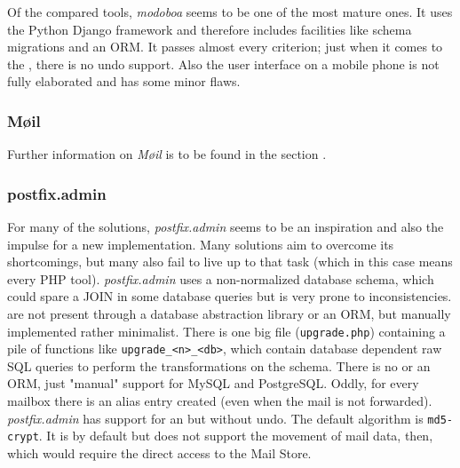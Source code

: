 \documentclass[12pt,a4paper]{scrartcl}
\begin{document}
				\noindent
				Of the compared tools, \emph{modoboa} seems to be one of the
				most mature ones. It uses the Python Django framework and
				therefore includes facilities like schema migrations and an
				\ac{ORM}. It passes almost every criterion; just when it comes
				to the , there is no undo support.
				Also the user interface on a mobile phone is not fully
				elaborated and has some minor flaws.

			\subsubsection{Møil}
				
				\noindent
				Further information on \emph{Møil} is to be found in the
				section .

			\subsubsection{postfix.admin}
			\label{sec:contestants:postfix.admin}

				\noindent
				For many of the solutions, \emph{postfix.admin} seems to be an
				inspiration and also the impulse for a new implementation. Many
				solutions aim to overcome its shortcomings, but many also fail
				to live up to that task (which in this case means every PHP
				tool). \emph{postfix.admin} uses a non-normalized \cite{dbnorm}
				database schema, which could spare a JOIN in some database
				queries but is very prone to inconsistencies.  are not present through a database abstraction
				library or an \ac{ORM}, but manually implemented rather
				minimalist. There is one big file (\texttt{upgrade.php})
				containing a pile of functions like
				\texttt{upgrade\_<n>\_<db>}, which contain database dependent
				raw \ac{SQL} queries to perform the transformations on the
				schema. There is no  or an \ac{ORM}, just "manual" support for
				MySQL and PostgreSQL. Oddly, for every mailbox there is an
				alias entry created (even when the mail is not forwarded).
				\emph{postfix.admin} has support for an  but without undo. The default  algorithm is \texttt{md5-crypt}. It is
				 by default but does not support the
				movement of mail data, then, which would require the direct
				access to the Mail Store.
\end{document}
